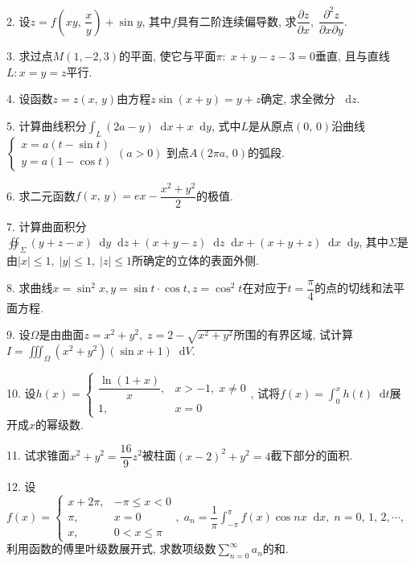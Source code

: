 \documentclass{article}
\newcommand*{\dif}{\mathop{}\!\mathrm{d}}
\begin{document}
2. 设$z = f\left(xy,\,\dfrac{x}{y}\right)+\sin y$, 其中$f$具有二阶连续偏导数, 求$\dfrac{\partial z}{\partial x},\; \dfrac{\partial^2 z}{\partial x \partial y}$.\par

3. 求过点$M(1, -2, 3)$的平面, 使它与平面$\pi:\;x+y-z-3=0$垂直, 且与直线$L: x=y=z$平行.\par

4. 设函数$z=z(x,\, y)$由方程$z\sin(x+y) = y+z$确定, 求全微分 $\dif z$.\par

5. 计算曲线积分$\displaystyle\int_L{(2a-y) \dif x + x \dif y}$, 式中$L$是从原点$(0,\,0)$沿曲线$\begin{cases}x=a(t-\sin t) \\ y=a(1-\cos t) \end{cases}(a>0)$ 到点$A(2\pi a, \, 0)$的弧段.\par

6. 求二元函数$f(x,\,y)=e x - \dfrac{x^2+y^2}{2}$的极值.\par

7. 计算曲面积分$\displaystyle\oiint_\Sigma{(y+z-x) \dif y \dif z + (x+y -z) \dif z \dif x + (x+y+z) \dif x \dif y}$, 其中$\Sigma$是由$|x|\leqslant 1,\; |y|\leqslant 1,\; |z|\leqslant 1$所确定的立体的表面外侧.\par

8. 求曲线$x=\sin^2 x, y=\sin t \cdot \cos t, z=\cos^2 t$在对应于$t=\dfrac{\pi}{4}$的点的切线和法平面方程.\par

9. 设$\Omega$是由曲面$z=x^2+y^2,\; z=2-\sqrt{x^2+y^2}$所围的有界区域, 试计算$I=\displaystyle\iiint_\Omega{(x^2+y^2)(\sin x + 1) \dif V}$.\par

10. 设$h(x)=\begin{cases} \dfrac{\ln(1+x)}{x}, &x>-1,\;x \neq 0 \\ 1, &x=0\end{cases}$, 试将$f(x)=\displaystyle\int_0^x{h(t) \dif t}$展开成$x$的幂级数.\par

11. 试求锥面$x^2+y^2=\dfrac{16}{9}z^2$被柱面$(x-2)^2+y^2=4$截下部分的面积.\par

12. 设$f(x)=\begin{cases}x+2\pi, &-\pi\leqslant x < 0 \\ \pi, &x=0\\ x, &0 < x \leqslant \pi \end{cases},\;a_n=\dfrac{1}{\pi}\displaystyle\int_{-\pi}^{\pi}{f(x)\cos nx \dif x},\; n=0,\,1,\,2,\cdots$, 利用函数的傅里叶级数展开式, 求数项级数$\displaystyle\sum\limits_{n=0}^\infty {a_n}$的和.\par
\end{document}
